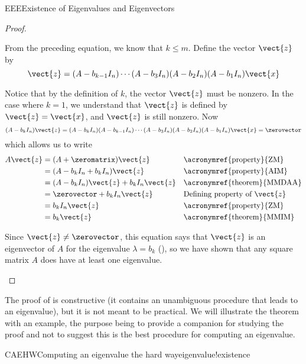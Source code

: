\begin{subsect}{EEE}{Existence of Eigenvalues and Eigenvectors}
\begin{proof}
\begin{para}
\end{para}
%
\begin{para}From the preceding equation, we know that $k\leq m$.  Define the vector $\vect{z}$ by
%
\begin{equation*}
\vect{z}=(A-b_{k-1}I_n)\cdots(A-b_3I_n)(A-b_2I_n)(A-b_1I_n)\vect{x}
\end{equation*}
\end{para}
%
\begin{para}Notice that by the definition of $k$, the vector $\vect{z}$ must be nonzero.  In the case where $k=1$, we understand that $\vect{z}$ is defined by $\vect{z}=\vect{x}$, and $\vect{z}$ is still nonzero.  Now
%
\begin{equation*}
(A-b_kI_n)\vect{z}=(A-b_kI_n)(A-b_{k-1}I_n)\cdots(A-b_3I_n)(A-b_2I_n)(A-b_1I_n)\vect{x}=\zerovector
\end{equation*}
%
which allows us to write
%
\begin{align*}
A\vect{z}
&=(A+\zeromatrix)\vect{z}&&\text{\acronymref{property}{ZM}}\\
&=(A-b_kI_n+b_kI_n)\vect{z}&&\text{\acronymref{property}{AIM}}\\
&=(A-b_kI_n)\vect{z}+b_kI_n\vect{z}&&\text{\acronymref{theorem}{MMDAA}}\\
&=\zerovector+b_kI_n\vect{z}&&\text{Defining property of $\vect{z}$}\\
&=b_kI_n\vect{z}&&\text{\acronymref{property}{ZM}}\\
&=b_k\vect{z}&&\text{\acronymref{theorem}{MMIM}}
\end{align*}
\end{para}
%
\begin{para}Since $\vect{z}\neq\zerovector$, this equation says that $\vect{z}$ is an eigenvector of $A$ for the eigenvalue $\lambda=b_k$ (), so we have shown that any square matrix $A$ does have at least one eigenvalue.\end{para}
%
\end{proof}
%
\begin{para}The proof of  is constructive (it contains an unambiguous procedure that leads to an eigenvalue), but it is not meant to be practical.  We will illustrate the theorem with an example, the purpose being to provide a companion for studying the proof and not to suggest this is the best procedure for computing an eigenvalue.\end{para}
%
\begin{example}{CAEHW}{Computing an eigenvalue the hard way}{eigenvalue!existence}

\end{example}
\end{subsect}
